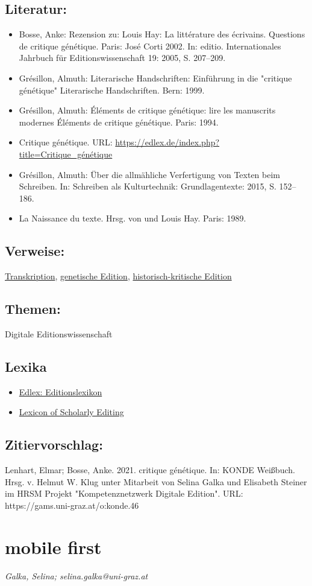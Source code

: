 \documentclass{article}
\begin{document}
        \subsection*{Literatur:}\begin{itemize}\item Bosse, Anke: Rezension zu: Louis Hay: La littérature des écrivains. Questions de critique génétique. Paris: José Corti 2002. In: editio. Internationales Jahrbuch für Editionswissenschaft 19: 2005, S. 207–209.\item Grésillon, Almuth: Literarische Handschriften: Einführung in die "critique génétique" Literarische Handschriften. Bern: 1999.\item Grésillon, Almuth: Éléments de critique génétique: lire les manuscrits modernes Éléments de critique génétique. Paris: 1994.\item Critique génétique. URL: \url{https://edlex.de/index.php?title=Critique_génétique}\item Grésillon, Almuth: Über die allmähliche Verfertigung von Texten beim Schreiben. In: Schreiben als Kulturtechnik: Grundlagentexte: 2015, S. 152–186.\item La Naissance du texte. Hrsg. von  und Louis Hay. Paris: 1989.\end{itemize}\subsection*{Verweise:}\href{https://gams.uni-graz.at/o:konde.197}{Transkription}, \href{https://gams.uni-graz.at/o:konde.90}{genetische Edition}, \href{https://gams.uni-graz.at/o:konde.93}{historisch-kritische Edition}\subsection*{Themen:}Digitale Editionswissenschaft\subsection*{Lexika}\begin{itemize}\item \href{https://edlex.de/index.php?title=Critique_g%C3%A9n%C3%A9tique}{Edlex: Editionslexikon}\item \href{https://lexiconse.uantwerpen.be/index.php/lexicon/genetic-criticism/}{Lexicon of Scholarly Editing}\end{itemize}\subsection*{Zitiervorschlag:}Lenhart, Elmar; Bosse, Anke. 2021. critique génétique. In: KONDE Weißbuch. Hrsg. v. Helmut W. Klug unter Mitarbeit von Selina Galka und Elisabeth Steiner im HRSM Projekt "Kompetenznetzwerk Digitale Edition". URL: https://gams.uni-graz.at/o:konde.46\newpage\section*{mobile first} \emph{Galka, Selina; selina.galka@uni-graz.at }\\
        
\end{document}
